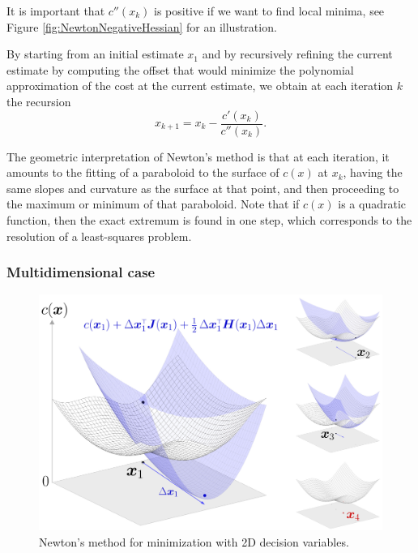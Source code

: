 \documentclass[10pt,a4paper]{article} %
\begin{document}
It is important that $c''(x_k)$ is positive if we want to find local minima, see Figure \ref{fig:NewtonNegativeHessian} for an illustration. 


By starting from an initial estimate $x_1$ and by recursively refining the current estimate by computing the offset that would minimize the polynomial approximation of the cost at the current estimate, we obtain at each iteration $k$ the recursion
\begin{equation}
	x_{k+1} = x_k - \frac{c'(x_k)}{c''(x_k)}.
	\label{eq:Taylor_1D_update}
\end{equation}

The geometric interpretation of Newton's method is that at each iteration, it amounts to the fitting of a paraboloid to the surface of $c(x)$ at $x_k$, having the same slopes and curvature as the surface at that point, and then proceeding to the maximum or minimum of that paraboloid. Note that if $c(x)$ is a quadratic function, then the exact extremum is found in one step, which corresponds to the resolution of a least-squares problem. 


\subsubsection*{Multidimensional case}

\begin{figure}
\centering
\includegraphics[width=.46\textwidth]{images/NewtonMethod2D01.jpg}
\caption{\footnotesize
Newton's method for minimization with 2D decision variables.
}
\label{fig:Newton2D}
\end{figure}
\end{document}
